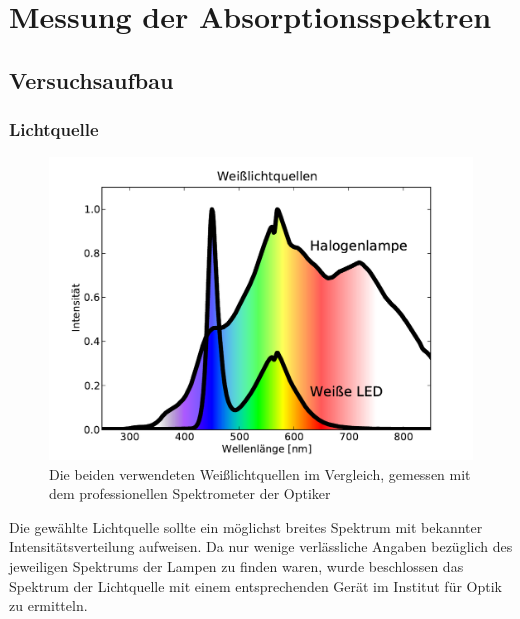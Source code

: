 \documentclass[11pt]{scrartcl}
\begin{document}


\section{Messung der Absorptionsspektren}

\subsection{Versuchsaufbau}
\subsubsection{Lichtquelle} %
\begin{figure}[ht]
\begin{center}
\includegraphics[width=1\textwidth]{quellspektren.pdf}
\end{center}
\vspace{-1.5\baselineskip}
\caption{Die beiden verwendeten Weißlichtquellen im Vergleich, gemessen mit dem professionellen Spektrometer der Optiker}
\label{fig:lichtquelle}
\end{figure}
Die gew\"ahlte Lichtquelle sollte ein m\"oglichst breites Spektrum mit bekannter Intensit\"atsverteilung aufweisen. Da nur wenige verlässliche Angaben bez\"uglich des jeweiligen Spektrums der Lampen zu finden waren, wurde beschlossen das Spektrum der Lichtquelle mit einem entsprechenden Ger\"at im Institut f\"ur Optik zu ermitteln.
\end{document}
